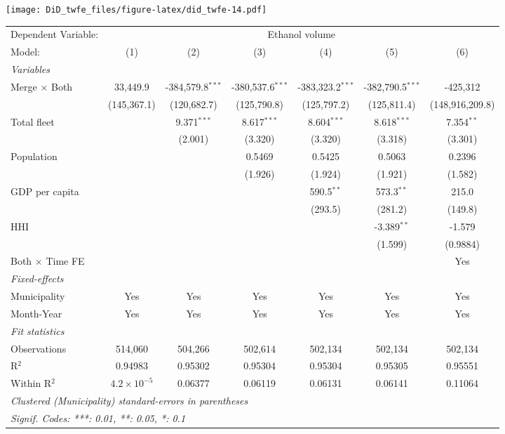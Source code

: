 \documentclass[
]{article}
\begin{document}
\texttt{[image: DiD\_twfe\_files/figure-latex/did\_twfe-14.pdf]}

\begin{tabular}{lcccccc}
\tabularnewline\midrule\midrule
Dependent Variable:&\multicolumn{6}{c}{Ethanol volume}\\
Model:&(1) & (2) & (3) & (4) & (5) & (6)\\
\midrule \emph{Variables}&   &   &   &   &   &  \\
Merge $\times $ Both & 33,449.9 & -384,579.8$^{***}$ & -380,537.6$^{***}$ & -383,323.2$^{***}$ & -382,790.5$^{***}$ & -425,312\\
  &(145,367.1) & (120,682.7) & (125,790.8) & (125,797.2) & (125,811.4) & (148,916,209.8)\\
Total fleet &    & 9.371$^{***}$ & 8.617$^{***}$ & 8.604$^{***}$ & 8.618$^{***}$ & 7.354$^{**}$\\
  &   & (2.001) & (3.320) & (3.320) & (3.318) & (3.301)\\
Population &    &    & 0.5469 & 0.5425 & 0.5063 & 0.2396\\
  &   &    & (1.926) & (1.924) & (1.921) & (1.582)\\
GDP per capita &    &    &    & 590.5$^{**}$ & 573.3$^{**}$ & 215.0\\
  &   &    &    & (293.5) & (281.2) & (149.8)\\
HHI &    &    &    &    & -3.389$^{**}$ & -1.579\\
  &   &    &    &    & (1.599) & (0.9884)\\
Both $\times$ Time FE &  &  &  &  &  & Yes\\
\midrule \emph{Fixed-effects}&   &   &   &   &   &  \\
Municipality & Yes & Yes & Yes & Yes & Yes & Yes\\
Month-Year & Yes & Yes & Yes & Yes & Yes & Yes\\
\midrule \emph{Fit statistics}&  & & & & & \\
Observations & 514,060&504,266&502,614&502,134&502,134&502,134\\
R$^2$ & 0.94983&0.95302&0.95304&0.95304&0.95305&0.95551\\
Within R$^2$ & $4.2\times 10^{-5}$&0.06377&0.06119&0.06131&0.06141&0.11064\\
\midrule\midrule\multicolumn{7}{l}{\emph{Clustered (Municipality) standard-errors in parentheses}}\\
\multicolumn{7}{l}{\emph{Signif. Codes: ***: 0.01, **: 0.05, *: 0.1}}\\
\end{tabular}
\end{document}
